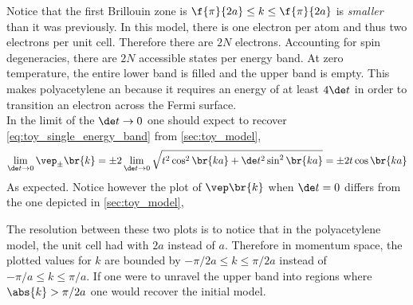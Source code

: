\documentclass{article}
\begin{document}
Notice that the first Brillouin zone is $\f{\pi}{2a} \leq k \leq \f{\pi}{2a}$ is \textit{smaller} than it was previously. In this model, there is one electron per atom and thus two electrons per unit cell. Therefore there are $2N$ electrons. Accounting for spin degeneracies, there are $2N$ accessible states per energy band. At zero temperature, the entire lower band is filled and the upper band is empty. This makes polyacetylene an  because it requires an energy of at least $4 \de t$ in order to transition an electron across the Fermi surface. \\

In the limit of the $\de t \to 0$ one should expect to recover \cref{eq:toy_single_energy_band} from \cref{sec:toy_model},
\[ \lim_{\de t \to 0}\vep_{\pm}\br{k} = \pm 2 \lim_{\de t \to 0}\sqrt{t^2 \cos^2\br{ka} + \de t^2 \sin^2\br{ka}} = \pm 2 t \cos\br{ka}  \]
As expected. Notice however the plot of $\vep\br{k}$ when $\de t = 0$ differs from the one depicted in \cref{sec:toy_model},
\begin{center}
\end{center}
The resolution between these two plots is to notice that in the polyacetylene model, the unit cell had with $2a$ instead of $a$. Therefore in momentum space, the plotted values for $k$ are bounded by $- \pi / 2a \leq k \leq \pi / 2a$ instead of $- \pi / a \leq k \leq \pi / a$. If one were to unravel the upper band into regions where $\abs{k} > \pi / 2a$ one would recover the initial model. \\
\end{document}
